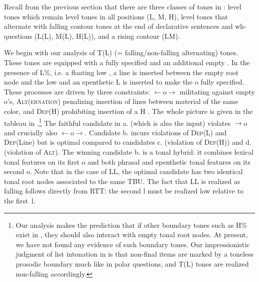 \documentclass[output=paper,newtxmath,modfonts,nonflat,hidelinks]{langsci/langscibook}
\begin{document}
Recall from the previous section that there are three classes of tones in : level tones which remain level tones in all positions (L, M, H), level tones that alternate with falling contour tones at the end of declarative sentences and wh-questions (L(L), M(L), H(L)), and a rising contour  (LM).

We begin with our analysis of T(L) (= falling/non-falling alternating) tones.
These tones are equipped with a fully specified  and an additional empty .
In the presence of L\%, i.e. a floating low , a line is inserted between the empty root node and the low  and an epenthetic L  is inserted to make the o fully specified.
These processes are driven by three constraints: 
\texttau$\leftarrow$o$\to$\textrho{} militating against empty o's, \textsc{Alt(ernation)} penalizing insertion of lines between material of the same color, and \textsc{Dep}(H) prohibiting insertion of a H .
The whole picture is given in the tableau in .\footnote{Our analysis makes the prediction that if other boundary tones such as H\% exist in , they should also interact with empty tonal root nodes. At present, we have not found any evidence of such boundary tones. Our impressionistic judgment of list intonation in  is that non-final items are marked by a toneless prosodic boundary much like in polar questions, and T(L) tones are realized non-falling accordingly.}
The faithful candidate in a. (which is also the input) violates \textrho$\to$o and crucially also \texttau$\leftarrow$o$\to$\textrho.
Candidate b. incurs violations of \textsc{Dep}(L) and \textsc{Dep}(Line) but is optimal compared to candidates c. (violation of \textsc{Dep}(H)) and d. (violation of \textsc{Alt}).
The winning candidate b. is a tonal hybrid: it combines lexical tonal features on its first o and both phrasal and epenthetic tonal features on its second o.
Note that in the case of LL, the optimal candidate has two identical tonal root nodes associated to the same TBU.
The fact that LL is realized as falling follows directly from RTT: the second l must be realized low relative to the first~l.

\setlength{\tabcolsep}{5pt} %
\end{document}
